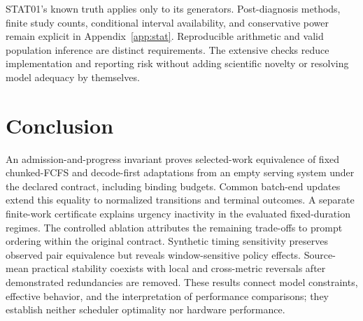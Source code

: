 STAT01's known truth applies only to its generators. Post-diagnosis methods,
finite study counts, conditional interval availability, and conservative
power remain explicit in Appendix~\ref{app:stat}. Reproducible arithmetic
and valid population inference are distinct requirements. The extensive
checks reduce implementation and reporting risk without adding scientific
novelty or resolving model adequacy by themselves.

\section{Conclusion}
An admission-and-progress invariant proves selected-work equivalence of
fixed chunked-FCFS and decode-first adaptations from an empty serving
system under the declared contract, including binding budgets. Common
batch-end updates extend this equality to normalized transitions and
terminal outcomes. A separate finite-work certificate explains urgency
inactivity in the evaluated fixed-duration regimes. The controlled ablation
attributes the remaining trade-offs to prompt ordering within the original
contract. Synthetic timing sensitivity preserves observed pair equivalence
but reveals window-sensitive policy effects. Source-mean practical stability
coexists with local and cross-metric reversals after demonstrated
redundancies are removed. These results connect model constraints,
effective behavior, and the interpretation of performance comparisons;
they establish neither scheduler optimality nor hardware performance.
